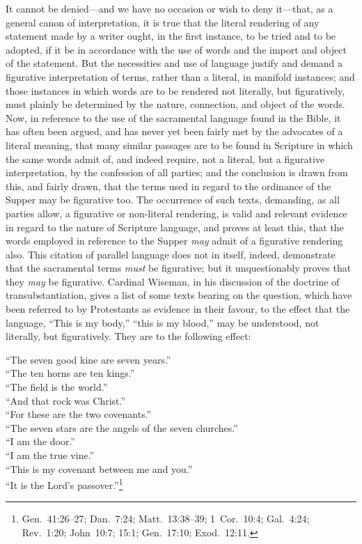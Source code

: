 \documentclass[
]{book}
\begin{document}
It cannot be denied---and we have no occasion or wish to deny it---that, as a general canon of interpretation, it is true that the literal rendering of any statement made by a writer ought, in the first instance, to be tried and to be adopted, if it be in accordance with the use of words and the import and object of the statement. But the necessities and use of language justify and demand a figurative interpretation of terms, rather than a literal, in manifold instances; and those instances in which words are to be rendered not literally, but figuratively, must plainly be determined by the nature, connection, and object of the words. Now, in reference to the use of the sacramental language found in the Bible, it has often been argued, and has never yet been fairly met by the advocates of a literal meaning, that many similar passages are to be found in Scripture in which the same words admit of, and indeed require, not a literal, but a figurative interpretation, by the confession of all parties; and the conclusion is drawn from this, and fairly drawn, that the terms used in regard to the ordinance of the Supper may be figurative too. The occurrence of such texts, demanding, as all parties allow, a figurative or non-literal rendering, is valid and relevant evidence in regard to the nature of Scripture language, and proves at least this, that the words employed in reference to the Supper \emph{may} admit of a figurative rendering also. This citation of parallel language does not in itself, indeed, demonstrate that the sacramental terms \emph{must} be figurative; but it unquestionably proves that they \emph{may} be figurative. Cardinal Wiseman, in his discussion of the doctrine of transubstantiation, gives a list of some texts bearing on the question, which have been referred to by Protestants as evidence in their favour, to the effect that the language, ``This is my body,'' ``this is my blood,'' may be understood, not literally, but figuratively. They are to the following effect:

``The seven good kine are seven years.''\\
``The ten horns are ten kings.''\\
``The field is the world.''\\
``And that rock was Christ.''\\
``For these are the two covenants.''\\
``The seven stars are the angels of the seven churches.''\\
``I am the door.''\\
``I am the true vine.''\\
``This is my covenant between me and you.''\\
``It is the Lord's passover.''\footnote{Gen.~41:26--27; Dan.~7:24; Matt.~13:38--39; 1~Cor.~10:4; Gal.~4:24; Rev.~1:20; John~10:7; 15:1; Gen.~17:10; Exod.~12:11.}
\end{document}
